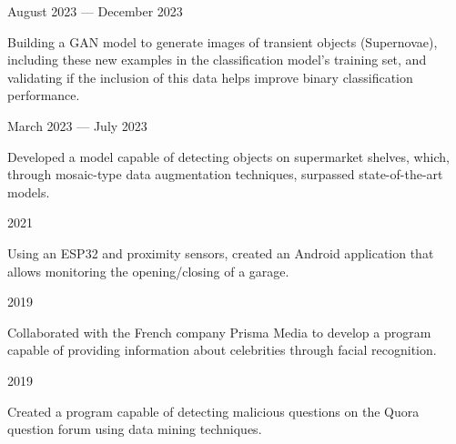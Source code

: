 \hfill August 2023 --- December 2023
\begin{zitemize}
\item Building a GAN model to generate images of transient objects (Supernovae), including these new examples in the classification model's training set, and validating if the inclusion of this data helps improve binary classification performance.
\end{zitemize}

 \hfill March 2023 --- July 2023
\begin{zitemize}
    \item Developed a model capable of detecting objects on supermarket shelves, which, through mosaic-type data augmentation techniques, surpassed state-of-the-art models.
\end{zitemize}

 \hfill 2021
\begin{zitemize}
    \item Using an ESP32 and proximity sensors, created an Android application that allows monitoring the opening/closing of a garage.
\end{zitemize}

 \hfill 2019
\begin{zitemize}
\item Collaborated with the French company Prisma Media to develop a program capable of providing information about celebrities through facial recognition.
\end{zitemize}

 \hfill 2019
\begin{zitemize}
\item Created a program capable of detecting malicious questions on the Quora question forum using data mining techniques.
\end{zitemize}
